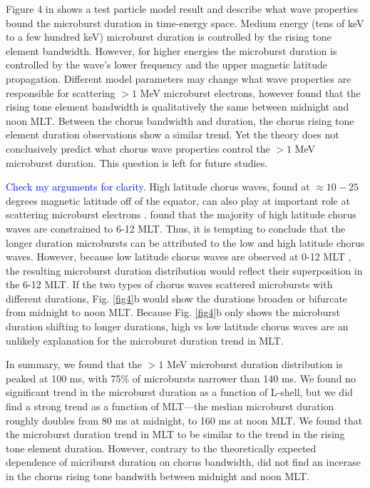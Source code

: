 \documentclass[draft]{agujournal2019}
\begin{document}
Figure 4 in  shows a test particle model result and describe what wave properties bound the microburst duration in time-energy space. Medium energy (tens of keV to a few hundred keV) microburst duration is controlled by the rising tone element bandwidth. However, for higher energies the microburst duration is controlled by the wave's lower frequency and the upper magnetic latitude propagation. Different model parameters may change what wave properties are responsible for scattering $>1$ MeV microburst electrons, however  found that the rising tone element bandwidth is qualitatively the same between midnight and noon MLT. Between the chorus bandwidth and duration, the chorus rising tone element duration observations show a similar trend. Yet the theory does not conclusively predict what chorus wave properties control the $> 1$ MeV microburst duration. This question is left for future studies.

\textcolor{blue}{Check my arguments for clarity.} High latitude chorus waves, found at $\approx 10-25$ degrees magnetic latitude off of the equator, can also play at important role at scattering microburst electrons \cite{Lorentzen2001a}.  found that the majority of high latitude chorus waves are constrained to 6-12 MLT. Thus, it is tempting to conclude that the longer duration microbursts can be attributed to the low and high latitude chorus waves. However, because low latitude chorus waves are observed at 0-12 MLT \cite{Li2009a}, the resulting microburst duration distribution would reflect their superposition in the 6-12 MLT. If the two types of chorus waves scattered microbursts with different durations, Fig. \ref{fig4}b would show the durations broaden or bifurcate from midnight to noon MLT. Because Fig. \ref{fig4}b only shows the microburst duration shifting to longer durations, high vs low latitude chorus waves are an unlikely explanation for the microburst duration trend in MLT.

In summary, we found that the $>1$ MeV microburst duration distribution is peaked at 100 ms, with 75\% of microbursts narrower than 140 ms. We found no significant trend in the microburst duration as a function of L-shell, but we did find a strong trend as a function of MLT---the median microburst duration roughly doubles from 80 ms at midnight, to 160 ms at noon MLT. We found that the microburst duration trend in MLT to be similar to the trend in the rising tone element duration. However, contrary to the theoretically expected dependence of micriburst duration on chorus bandwidth,  did not find an incerase in the chorus rising tone bandwith between midnight and noon MLT.
\end{document}

